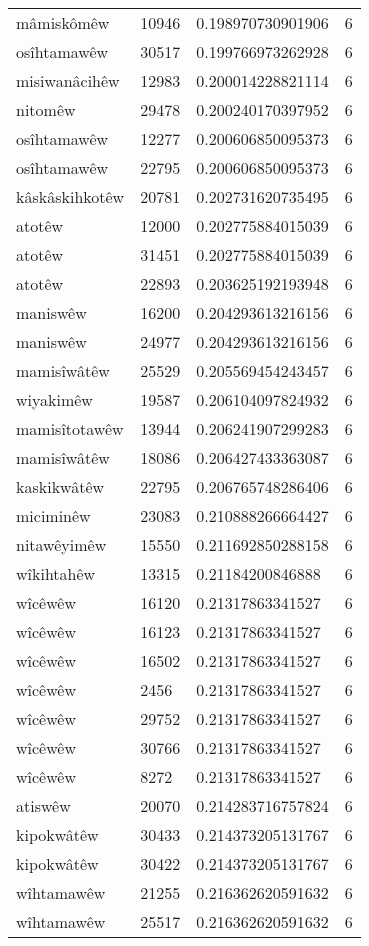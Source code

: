 \begin{longtable}{llll}
mâmiskômêw & 10946 & 0.198970730901906 & 6\\
osîhtamawêw & 30517 & 0.199766973262928 & 6\\
misiwanâcihêw & 12983 & 0.200014228821114 & 6\\
nitomêw & 29478 & 0.200240170397952 & 6\\
osîhtamawêw & 12277 & 0.200606850095373 & 6\\
osîhtamawêw & 22795 & 0.200606850095373 & 6\\
kâskâskihkotêw & 20781 & 0.202731620735495 & 6\\
atotêw & 12000 & 0.202775884015039 & 6\\
atotêw & 31451 & 0.202775884015039 & 6\\
atotêw & 22893 & 0.203625192193948 & 6\\
maniswêw & 16200 & 0.204293613216156 & 6\\
maniswêw & 24977 & 0.204293613216156 & 6\\
mamisîwâtêw & 25529 & 0.205569454243457 & 6\\
wiyakimêw & 19587 & 0.206104097824932 & 6\\
mamisîtotawêw & 13944 & 0.206241907299283 & 6\\
mamisîwâtêw & 18086 & 0.206427433363087 & 6\\
kaskikwâtêw & 22795 & 0.206765748286406 & 6\\
miciminêw & 23083 & 0.210888266664427 & 6\\
nitawêyimêw & 15550 & 0.211692850288158 & 6\\
wîkihtahêw & 13315 & 0.21184200846888 & 6\\
wîcêwêw & 16120 & 0.21317863341527 & 6\\
wîcêwêw & 16123 & 0.21317863341527 & 6\\
wîcêwêw & 16502 & 0.21317863341527 & 6\\
wîcêwêw & 2456 & 0.21317863341527 & 6\\
wîcêwêw & 29752 & 0.21317863341527 & 6\\
wîcêwêw & 30766 & 0.21317863341527 & 6\\
wîcêwêw & 8272 & 0.21317863341527 & 6\\
atiswêw & 20070 & 0.214283716757824 & 6\\
kipokwâtêw & 30433 & 0.214373205131767 & 6\\
kipokwâtêw & 30422 & 0.214373205131767 & 6\\
wîhtamawêw & 21255 & 0.216362620591632 & 6\\
wîhtamawêw & 25517 & 0.216362620591632 & 6\\

\end{longtable}
